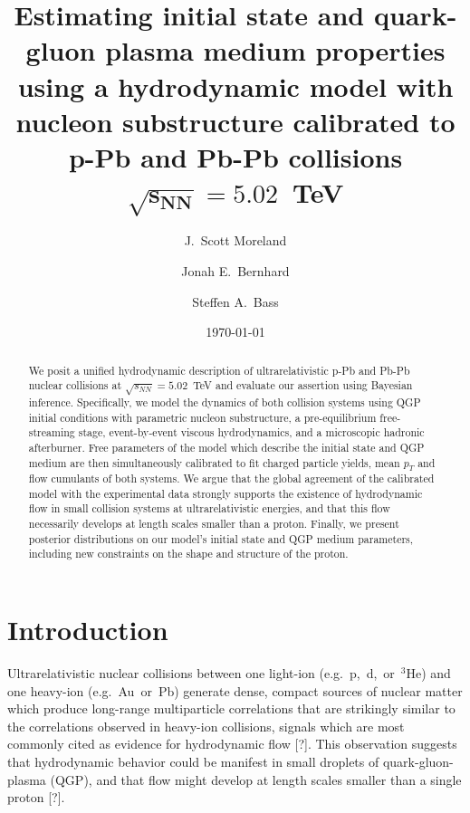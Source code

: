 \documentclass[aps,prc,reprint,amsmath,nofootinbib]{revtex4-1}
\newcommand{\sqrts}{\sqrt{s_{NN}}}
\newcommand{\note}{\textcolor{theblue}{[?]}}
\def\\#1{ #1}
\begin{document}
\title{
  Estimating initial state and quark-gluon plasma medium properties\\
  using a hydrodynamic model with nucleon substructure\\
  calibrated to p-Pb and Pb-Pb collisions \texorpdfstring{$\mathbf{\sqrts=5.02}$}{}~TeV
}

\author{J.\ Scott Moreland}
\author{Jonah E.\ Bernhard}
\author{Steffen A.\ Bass}


\date{\today}

\begin{abstract}
  We posit a unified hydrodynamic description of ultrarelativistic p-Pb and Pb-Pb nuclear collisions at $\sqrts=5.02$~TeV and evaluate our assertion using Bayesian inference. Specifically, we model the dynamics of both collision systems using QGP initial conditions with parametric nucleon substructure, a pre-equilibrium free-streaming stage, event-by-event viscous hydrodynamics, and a microscopic hadronic afterburner.
Free parameters of the model which describe the initial state and QGP medium are then simultaneously calibrated to fit charged particle yields, mean $p_T$ and flow cumulants of both systems.
We argue that the global agreement of the calibrated model with the experimental data strongly supports the existence of hydrodynamic flow in small collision systems at ultrarelativistic energies, and that this flow necessarily develops at length scales smaller than a proton.
Finally, we present posterior distributions on our model's initial state and QGP medium parameters, including new constraints on the shape and structure of the proton.
\end{abstract}

\maketitle

\section{Introduction}

  Ultrarelativistic nuclear collisions between one light-ion \mbox{(e.g.\ p, d, or ${}^3$He)} and one heavy-ion \mbox{(e.g.\ Au or Pb)} generate dense, compact sources of nuclear matter which produce long-range multiparticle correlations that are strikingly similar to the correlations observed in heavy-ion collisions, signals which are most commonly cited as evidence for hydrodynamic flow \note.
This observation suggests that hydrodynamic behavior could be manifest in small droplets of quark-gluon-plasma (QGP), and that flow might develop at length scales smaller than a single proton \note.
\end{document}
